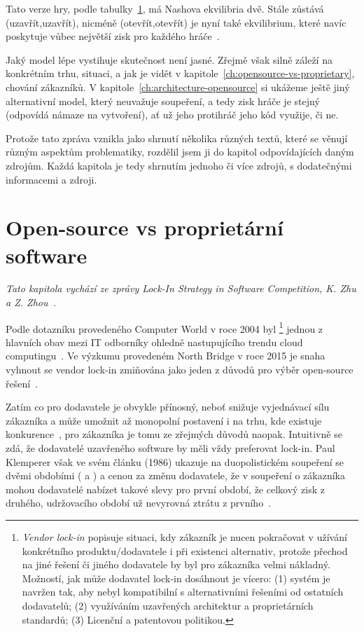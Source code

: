 \begin{multicols}{2}
Tato verze hry, podle tabulky~\ref{tab:new-prisoner}, má Nashova ekvilibria dvě. Stále zůstává (uzavřít,uzavřít), nicméně (otevřít,otevřít) je nyní také ekvilibrium, které navíc poskytuje vůbec největší zisk pro každého hráče~\cite{network-effects-opensource}.

Jaký model lépe vystihuje skutečnost není jasné. Zřejmě však silně záleží na konkrétním trhu, situaci, a jak je vidět v kapitole~\ref{ch:opensource-vs-proprietary}, chování zákazníků. V kapitole~\ref{ch:architecture-opensource} si ukážeme ještě jiný alternativní model, který neuvažuje soupeření, a tedy zisk hráče je stejný (odpovídá námaze na vytvoření), ať už jeho protihráč jeho kód využije, či ne.

Protože tato zpráva vznikla jako shrnutí několika různých textů, které se věnují různým aspektům problematiky, rozdělil jsem ji do kapitol odpovídajících daným zdrojům. Každá kapitola je tedy shrnutím jednoho či více zdrojů, s dodatečnými informacemi a zdroji.




\section{Open-source vs proprietární software}
\label{tab:new-prisoner}
	{\em Tato kapitola vychází ze zprávy Lock-In Strategy in Software Competition, K. Zhu a Z. Zhou~\cite{lock-in-competition}.}

	Podle dotazníku provedeného Computer World v roce 2004 byl \footnote{{\em Vendor lock-in} popisuje situaci, kdy zákazník je nucen pokračovat v užívání konkrétního produktu/dodavatele i při existenci alternativ, protože přechod na jiné řešení či jiného dodavatele by byl pro zákazníka velmi nákladný. Možností, jak může dodavatel lock-in dosáhnout je vícero: (1) systém je navržen tak, aby nebyl kompatibilní s alternativními řešeními od ostatních dodavatelů; (2) využíváním uzavřených architektur a proprietárních standardů; (3) Licenční a patentovou politikou.} jednou z hlavních obav mezi IT odborníky ohledně nastupujícího trendu cloud computingu~\cite{computer-world-2004}. Ve výzkumu provedeném North Bridge v roce 2015 je snaha vyhnout se vendor lock-in zmiňována jako jeden z důvodů pro výběr open-source řešení~\cite{survey-2015}.

	Zatím co pro dodavatele je  obvykle přínosný, neboť snižuje
	vyjednávací sílu zákazníka a může umožnit až monopolní postavení i na trhu,
	kde existuje konkurence~\cite[str. 1]{lock-in-competition}, pro zákazníka
	je tomu ze zřejmých důvodů naopak. Intuitivně se zdá, že dodavatelé
	uzavřeného software by měli vždy preferovat lock-in. Paul Klemperer však ve
	svém článku (1986) ukazuje na duopolistickém soupeření se dvěmi obdobími
	( a ) a cenou za změnu dodavatele, že v soupeření o zákazníka mohou dodavatelé nabízet takové slevy pro první období, že celkový zisk z druhého, udržovacího období už nevyrovná ztrátu z prvního~\cite{klemperer-switching-costs,lock-in-competition}.


\end{multicols}
